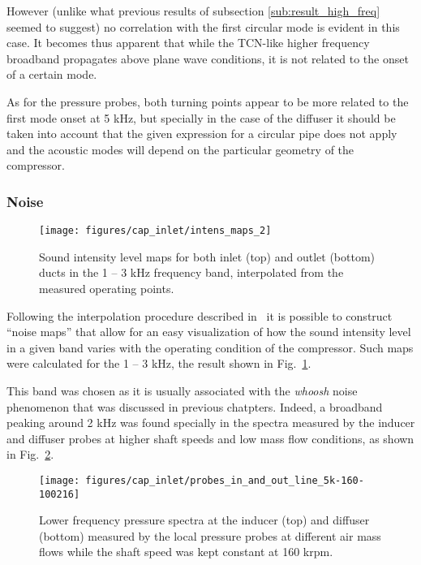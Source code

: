 However (unlike what previous results of subsection \ref{sub:result_high_freq} seemed to suggest) no correlation with the first circular mode is evident in this case. It becomes thus apparent that while the TCN-like higher frequency broadband propagates above plane wave conditions, it is not related to the onset of a certain mode.

As for the pressure probes, both turning points appear to be more related to the first mode onset at 5 kHz, but specially in the case of the diffuser it should be taken into account that the given expression for a circular pipe does not apply and the acoustic modes will depend on the particular geometry of the compressor.

\subsubsection{Noise}

\begin{figure}[b!]
\centering
\texttt{[image: figures/cap\_inlet/intens\_maps\_2]}
\caption[SIL maps in the 1 -- 3 kHz band]{Sound intensity level maps for both inlet (top) and outlet (bottom) ducts in the 1 -- 3 kHz frequency band, interpolated from the measured operating points.}
\label{fig:intens_maps}
\end{figure}

Following the interpolation procedure described in~\cite{torregrosa2016experimental} it is possible to construct ``noise maps'' that allow for an easy visualization of how the sound intensity level in a given band varies with the operating condition of the compressor. Such maps were calculated for the 1 -- 3 kHz, the result shown in Fig.~\ref{fig:intens_maps}.

This band was chosen as it is usually associated with the \emph{whoosh} noise~\cite{evans2005minimizing,trochon2001new} phenomenon that was discussed in previous chatpters. Indeed, a broadband peaking around 2 kHz was found specially in the spectra measured by the inducer and diffuser probes at higher shaft speeds and low mass flow conditions, as shown in Fig.~\ref{fig:probes_5K}.

\begin{figure}[thb!]
\centering
\texttt{[image: figures/cap\_inlet/probes\_in\_and\_out\_line\_5k-160-100216]}
\caption[Lower frequency spectra from the probes]{Lower frequency pressure spectra at the inducer (top) and diffuser (bottom) measured by the local pressure probes at different air mass flows while the shaft speed was kept constant at 160 krpm.}
\label{fig:probes_5K}
\end{figure}

